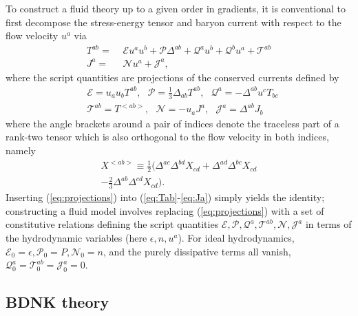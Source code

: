 \documentclass[%
notitlepage,
superscriptaddress,
nofootinbib,
amsmath,
amssymb,
aps,
twocolumn
]{revtex4-1}
\begin{document}
To construct a fluid theory up to a given order in gradients, it is conventional to first decompose the stress-energy tensor and baryon current with respect to the flow velocity $u^{a}$ via
\begin{align}
T^{a b} =\,\, &\mathcal{E} u^a u^b + \mathcal{P} \Delta^{ab} + \mathcal{Q}^a u^b + \mathcal{Q}^b u^a + \mathcal{T}^{ab} \label{eq:Tab} \\
J^{a} =\,\, &\mathcal{N} u^{a} + \mathcal{J}^{a}, \label{eq:Ja}
\end{align}
where the script quantities are projections of the conserved currents defined by
\begin{equation} \label{eq:projections}
\begin{aligned}
&\mathcal{E} = u_{a} u_{b} T^{ab}, ~~~ \mathcal{P} = \frac{1}{3} \Delta_{a b} T^{ab}, ~~~ \mathcal{Q}^{a} = - \Delta^{a b} u^{c} T_{b c} \\
&\mathcal{T}^{ab} = T^{<ab>}, ~~~ \mathcal{N} = - u_{a} J^{a}, ~~~ \mathcal{J}^{a} = \Delta^{a b} J_{b}
\end{aligned}
\end{equation}
where the angle brackets around a pair of indices denote the traceless part of a rank-two tensor which is also orthogonal to the flow velocity in both indices, namely
\begin{multline}
X^{<ab>} \equiv \frac{1}{2} \Big( \Delta^{a c} \Delta^{b d} X_{cd} + \Delta^{a d} \Delta^{b c} X_{cd} \\
- \frac{2}{3} \Delta^{a b} \Delta^{c d} X_{cd} \Big).
\end{multline}
Inserting (\ref{eq:projections}) into (\ref{eq:Tab}-\ref{eq:Ja}) simply yields the identity; constructing a fluid model involves replacing (\ref{eq:projections}) with a set of constitutive relations defining the script quantities $\mathcal{E}, \mathcal{P}, \mathcal{Q}^{a}, \mathcal{T}^{ab}, \mathcal{N}, \mathcal{J}^{a}$ in terms of the hydrodynamic variables (here $\epsilon, n, u^{a}$).  For ideal hydrodynamics, ${\mathcal{E}_{0} = \epsilon, \mathcal{P}_{0} = P, \mathcal{N}_{0} = n}$, and the purely dissipative terms all vanish, ${\mathcal{Q}_{0}^{a} = \mathcal{T}_{0}^{ab} = \mathcal{J}_{0}^{a} = 0}$.

\subsection{BDNK theory}
\end{document}
